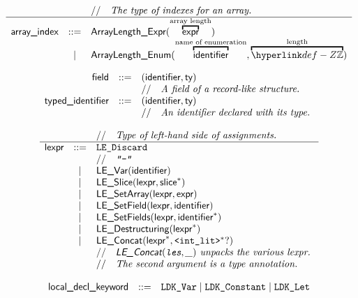 \documentclass{book}
\begin{document}
\[
  \begin{array}{rcl}
    & & \ASTComment{The type of indexes for an array.}  \\
    \hline
    \arrayindex & ::=
      & \ArrayLengthExpr(\overtext{\expr}{array length}) \\
    &|& \ArrayLengthEnum(\overtext{\identifier}{name of enumeration}, \overtext{\Z}{length}) \\
  \end{array}
\]

\[
\begin{array}{rcl}
\textsf{field} &::=& (\textsf{identifier}, \textsf{ty})\\
  & & //\quad\textit{A field of a record-like structure.}\ \\
\textsf{typed\_identifier} &::=& (\textsf{identifier}, \textsf{ty})\\
  & & //\quad\textit{An identifier declared with its type.}\ \\
\end{array}
\]

\[
\begin{array}{rcl}
& & //\quad\textit{Type of left-hand side of assignments.}\ \\
\hline
\textsf{lexpr} &::=& \texttt{LE\_Discard}\\
  & & //\quad\textit{\texttt{"-"}}\ \\
  &|& \textsf{LE\_Var}(\textsf{identifier})\\
  &|& \textsf{LE\_Slice}(\textsf{lexpr}, \textsf{slice}^*)\\
  &|& \textsf{LE\_SetArray}(\textsf{lexpr}, \textsf{expr})\\
  &|& \textsf{LE\_SetField}(\textsf{lexpr}, \textsf{identifier})\\
  &|& \textsf{LE\_SetFields}(\textsf{lexpr}, \textsf{identifier}^*)\\
  &|& \textsf{LE\_Destructuring}(\textsf{lexpr}^*)\\
  &|& \textsf{LE\_Concat}(\textsf{lexpr}^*, \texttt{<int\_lit>}^*?)\\
  & & //\quad\textit{$\textsf{LE\_Concat}(\texttt{les}, \_)$ unpacks the various lexpr.}\ \\
  & & //\quad\textit{The second argument is a type annotation.}\ \\
\end{array}
\]

\[
\begin{array}{rcl}
\textsf{local\_decl\_keyword} &::=& \texttt{LDK\_Var} \;|\; \texttt{LDK\_Constant} \;|\; \texttt{LDK\_Let}\\
\end{array}
\]
\end{document}
